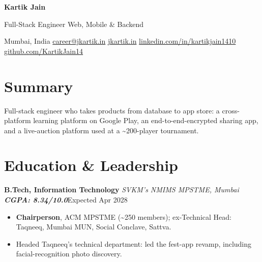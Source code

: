 \documentclass[10pt, a4paper]{article}
\newcommand{\role}[3]{\par\vspace{2.5pt}\textbf{#1} \textbar{} \textit{#2}\hfill #3\par}
\newcommand{\lnk}[2]{\href{#1}{\color{linkc}#2}}
\newcommand{\sep}{\enspace\textbar\enspace}
\begin{document}
\begin{center}
  {\fontsize{22pt}{24pt}\selectfont\bfseries Kartik Jain}\par\vspace{3pt}
  {\normalsize Full-Stack Engineer \textbar{} Web, Mobile \& Backend}\par\vspace{3pt}
  {\small Mumbai, India\sep
  \lnk{mailto:career@jkartik.in}{career@jkartik.in}\sep
  \lnk{https://jkartik.in/}{jkartik.in}\sep
  \lnk{https://linkedin.com/in/kartikjain1410}{linkedin.com/in/kartikjain1410}\sep
  \lnk{https://github.com/KartikJain14}{github.com/KartikJain14}}
\end{center}

\section{Summary}
Full-stack engineer who takes products from database to app store: a cross-platform learning platform on Google Play, an
end-to-end-encrypted sharing app, and a live-auction platform used at a \textasciitilde{}200-player tournament.

\section{Education \& Leadership}
\role{B.Tech, Information Technology}{SVKM's NMIMS MPSTME, Mumbai \textbar{} \textup{\textbf{CGPA: 8.34/10.0}}}{Expected Apr 2028}
\begin{itemize}
  \item \textbf{Chairperson}, ACM MPSTME (\textasciitilde{}250 members); ex-Technical Head: Taqneeq, Mumbai MUN, Social Conclave, Sattva.
  \item Headed Taqneeq's technical department: led the fest-app revamp, including facial-recognition photo discovery.
\end{itemize}
\end{document}
